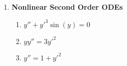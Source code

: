 \documentclass[letterpaper, fontsize=12pt]{scrartcl} %
\numberwithin{equation}{section} %
\numberwithin{figure}{section} %
\numberwithin{table}{section} %
\begin{document}
\begin{enumerate}
\begin{enumerate}[label=(\alph*)]
\end{enumerate}

\item \textbf{Nonlinear Second Order ODEs}
\begin{enumerate}[label=(\alph*)]
\item $y''+y'^3\sin(y)=0$

\item $yy'' = 3y'^2$

\item $y'' =  1 + y'^2$
\end{enumerate}



\end{enumerate}
\end{document}
